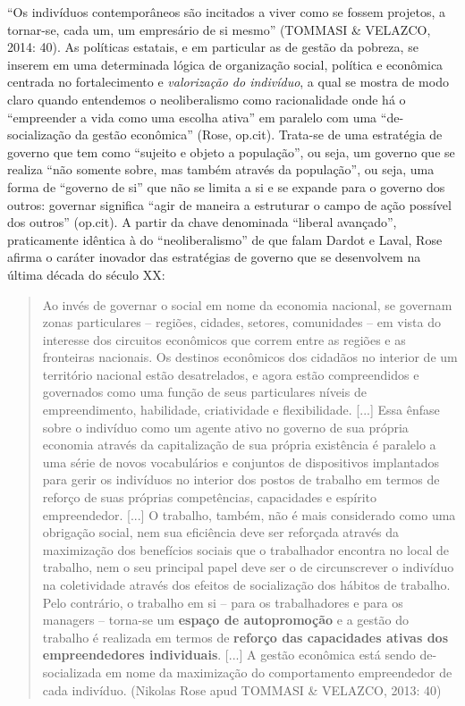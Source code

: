``Os indivíduos contemporâneos são incitados a viver como se fossem
projetos, a tornar-se, cada um, um empresário de si mesmo'' (TOMMASI \&
VELAZCO, 2014: 40). As políticas estatais, e em particular as de gestão
da pobreza, se inserem em uma determinada lógica de organização social,
política e econômica centrada no fortalecimento e \emph{valorização do
indivíduo}, a qual se mostra de modo claro quando entendemos o
neoliberalismo como racionalidade onde há o ``empreender a vida como uma
escolha ativa'' em paralelo com uma ``de-socialização da gestão
econômica'' (Rose, op.cit). Trata-se de uma estratégia de governo que
tem como ``sujeito e objeto a população'', ou seja, um governo que se
realiza ``não somente sobre, mas também através da população'', ou seja,
uma forma de ``governo de si'' que não se limita a si e se expande para
o governo dos outros: governar significa ``agir de maneira a estruturar
o campo de ação possível dos outros'' (op.cit). A partir da chave
denominada ``liberal avançado'', praticamente idêntica à do
``neoliberalismo'' de que falam Dardot e Laval, Rose afirma o caráter
inovador das estratégias de governo que se desenvolvem na última década
do século XX:

\begin{quote}
Ao invés de governar o social em nome da economia nacional, se governam
zonas particulares -- regiões, cidades, setores, comunidades -- em vista
do interesse dos circuitos econômicos que correm entre as regiões e as
fronteiras nacionais. Os destinos econômicos dos cidadãos no interior de
um território nacional estão desatrelados, e agora estão compreendidos e
governados como uma função de seus particulares níveis de
empreendimento, habilidade, criatividade e flexibilidade. {[}...{]} Essa
ênfase sobre o indivíduo como um agente ativo no governo de sua própria
economia através da capitalização de sua própria existência é paralelo a
uma série de novos vocabulários e conjuntos de dispositivos implantados
para gerir os indivíduos no interior dos postos de trabalho em termos de
reforço de suas próprias competências, capacidades e espírito
empreendedor. {[}...{]} O trabalho, também, não é mais considerado como
uma obrigação social, nem sua eficiência deve ser reforçada através da
maximização dos benefícios sociais que o trabalhador encontra no local
de trabalho, nem o seu principal papel deve ser o de circunscrever o
indivíduo na coletividade através dos efeitos de socialização dos
hábitos de trabalho. Pelo contrário, o trabalho em si -- para os
trabalhadores e para os managers -- torna-se um \textbf{espaço de
autopromoção} e a gestão do trabalho é realizada em termos de
\textbf{reforço das capacidades ativas dos empreendedores individuais}.
{[}...{]} A gestão econômica está sendo de-socializada em nome da
maximização do comportamento empreendedor de cada indivíduo. (Nikolas
Rose apud TOMMASI \& VELAZCO, 2013: 40)
\end{quote}

